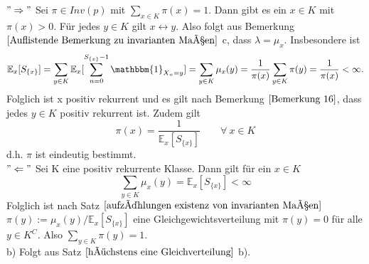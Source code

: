 $"\Rightarrow"$ Sei $\pi \in Inv(p)$ mit $\sum_{x \in K} \pi(x) = 1$. Dann gibt es ein $x \in K$ mit $\pi(x) > 0$. Für jedes $y \in K$ gilt $x \leftrightarrow y$. Also folgt aus Bemerkung $\ref{Auflistende Bemerkung zu invarianten Maßen}$ c, dass $\lambda = \mu_{x}$. Insbesondere ist
\begin{equation*}
\mathbb{E}_{x}[S_{\lbrace x \rbrace}] = \sum_{y \in K} \mathbb{E}_{x}[\sum_{n=0}^{S_{\lbrace x \rbrace}-1} \mathbbm{1}_{X_{n}=y}] = \sum_{y \in K} \mu_{x}(y) = \dfrac{1}{\pi(x)} \sum_{y \in K} \pi(y) = \dfrac{1}{\pi(x)} < \infty.
\end{equation*}
Folglich ist x positiv rekurrent und es gilt nach Bemerkung $\ref{Bemerkung 16}$, dass jedes $y \in K$ positiv rekurrent ist. Zudem gilt
\begin{equation*}
\pi(x) = \dfrac{1}{\mathbb{E}_{x}[S_{\lbrace x \rbrace}]} \qquad \forall  \: x \in K
\end{equation*}
d.h. $\pi$ ist eindeutig bestimmt.
\\
$"\Leftarrow"$ Sei K eine positiv rekurrente Klasse. Dann gilt für ein $x \in K$
\begin{equation*}
\sum_{y \in K} \mu_{x}(y) = \mathbb{E}_{x}[S_{\lbrace x \rbrace}]  < \infty
\end{equation*}
Folglich ist nach Satz $\ref{aufzählungen existenz von invarianten Maßen}$ $\pi(y) := \mu_{x}(y) / \mathbb{E}_{x}[S_{\lbrace x \rbrace}]$ eine Gleichgewichtsverteilung mit $\pi(y) = 0$ für alle $y \in K^{C}$. Also $\sum_{y \in K} \pi(y) = 1$.
\\
b) Folgt aus Satz $\ref{höchstens eine Gleichverteilung}$ b).
